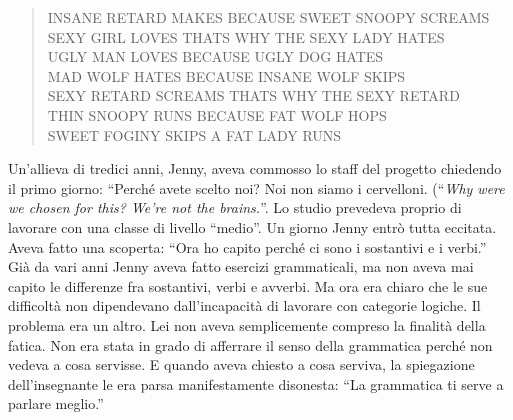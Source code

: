 \begin{quote}
INSANE RETARD MAKES BECAUSE SWEET SNOOPY SCREAMS\\
SEXY GIRL LOVES THATS WHY THE SEXY LADY HATES\\
UGLY MAN LOVES BECAUSE UGLY DOG HATES\\
MAD WOLF HATES BECAUSE INSANE WOLF SKIPS\\
SEXY RETARD SCREAMS THATS WHY THE SEXY RETARD\\
THIN SNOOPY RUNS BECAUSE FAT WOLF HOPS\\
SWEET FOGINY SKIPS A FAT LADY RUNS\\
\end{quote}

Un'allieva di tredici anni, Jenny, aveva commosso lo staff del progetto chiedendo il primo giorno: “Perché avete scelto noi? Noi non siamo i cervelloni. (“\textit{Why were we chosen for this? We're not the brains.}”. Lo studio prevedeva proprio di lavorare con una classe di livello “medio”. Un giorno Jenny entrò tutta eccitata. Aveva fatto una scoperta: “Ora ho capito perché ci  sono i sostantivi e i verbi.” Già da vari anni Jenny aveva fatto esercizi grammaticali, ma non aveva mai capito le differenze fra sostantivi, verbi e avverbi. Ma ora era chiaro che le sue difficoltà non dipendevano dall'incapacità di lavorare con categorie logiche. Il problema era un altro. Lei non aveva semplicemente compreso la finalità della fatica. Non era stata in grado di afferrare il senso della grammatica perché non vedeva a cosa servisse. E quando aveva chiesto a cosa serviva, la spiegazione dell'insegnante le era parsa manifestamente disonesta: “La grammatica ti serve a parlare meglio.”

